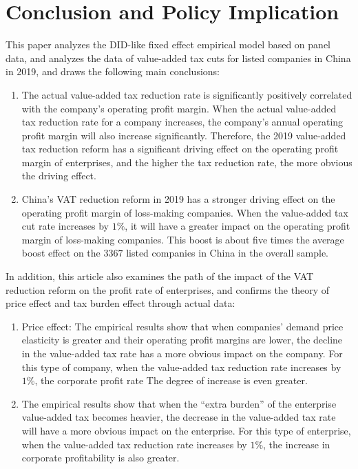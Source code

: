 \documentclass[3p,times]{elsarticle}
\begin{document}
\section{Conclusion and Policy Implication}
This paper analyzes the DID-like fixed effect empirical model based on panel data, and analyzes the data of value-added tax cuts for listed companies in China in 2019, and draws the following main conclusions:
\begin{enumerate}[(1)]
    \item The actual value-added tax reduction rate is significantly positively correlated with the company's operating profit margin. When the actual value-added tax reduction rate for a company increases, the company's annual operating profit margin will also increase significantly. Therefore, the 2019 value-added tax reduction reform has a significant driving effect on the operating profit margin of enterprises, and the higher the tax reduction rate, the more obvious the driving effect.
    \item China's VAT reduction reform in 2019 has a stronger driving effect on the operating profit margin of loss-making companies. When the value-added tax cut rate increases by $1\%$, it will have a greater impact on the operating profit margin of loss-making companies. This boost is about five times the average boost effect on the $3367$ listed companies in China in the overall sample.
\end{enumerate}

In addition, this article also examines the path of the impact of the VAT reduction reform on the profit rate of enterprises, and confirms the theory of price effect and tax burden effect through actual data:
\begin{enumerate}[(1)]
    \item Price effect: The empirical results show that when companies’ demand price elasticity is greater and their operating profit margins are lower, the decline in the value-added tax rate has a more obvious impact on the company. For this type of company, when the value-added tax reduction rate increases by $1\%$, the corporate profit rate The degree of increase is even greater.
    \item The empirical results show that when the “extra burden” of the enterprise value-added tax becomes heavier, the decrease in the value-added tax rate will have a more obvious impact on the enterprise. For this type of enterprise, when the value-added tax reduction rate increases by $1\%$, the increase in corporate profitability is also greater.
\end{enumerate}
\end{document}
